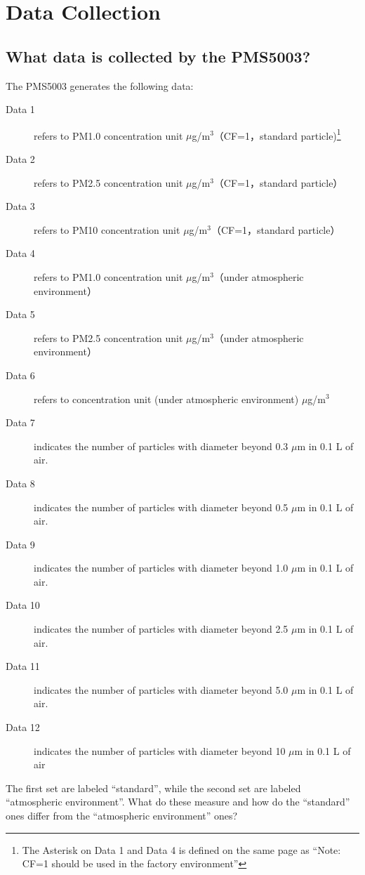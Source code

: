 \documentclass{article}\usepackage[]{graphicx}\usepackage[]{xcolor}
\begin{document}
\section{Data Collection}
\subsection{What data is collected by the PMS5003?}

The PMS5003 generates the following data: 

\begin{description}
  \item[Data 1] refers to PM1.0 concentration unit $\mu$g/m$^3$（CF=1，standard particle)\footnote{The Asterisk on Data 1 and Data 4 is defined on the same page as ``Note: CF=1 should be used in the factory environment''}
  \item[Data 2] refers to PM2.5 concentration unit $\mu$g/m$^3$（CF=1，standard particle）
  \item[Data 3] refers to PM10 concentration unit $\mu$g/m$^3$（CF=1，standard particle）
  \item[Data 4] refers to PM1.0 concentration unit $\mu$g/m$^3$（under atmospheric environment）
  \item[Data 5] refers to PM2.5 concentration unit $\mu$g/m$^3$（under atmospheric environment）
  \item[Data 6] refers to concentration unit (under atmospheric environment) $\mu$g/m$^3$
  \item[Data 7] indicates the number of particles with diameter beyond 0.3 $\mu$m in 0.1 L of air.
  \item[Data 8] indicates the number of particles with diameter beyond 0.5 $\mu$m in 0.1 L of air.
  \item[Data 9] indicates the number of particles with diameter beyond 1.0 $\mu$m in 0.1 L of air.
  \item[Data 10] indicates the number of particles with diameter beyond 2.5 $\mu$m in 0.1 L of air.
  \item[Data 11] indicates the number of particles with diameter beyond 5.0 $\mu$m in 0.1 L of air.
  \item[Data 12] indicates the number of particles with diameter beyond 10 $\mu$m in 0.1 L of air

\end{description}

The first set are labeled ``standard'', while the second set are labeled ``atmospheric environment''. What do these measure and how do the ``standard'' ones differ from the ``atmospheric environment'' ones?
\end{document}
